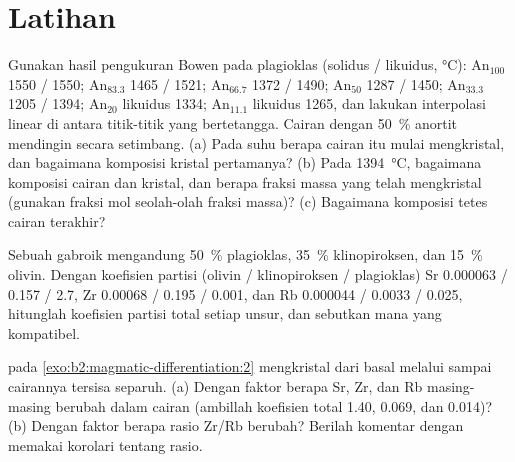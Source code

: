 \section{Latihan}

\begin{exercise}[$\star$]\label{exo:b2:magmatic-differentiation:1}
Gunakan hasil pengukuran Bowen pada plagioklas (solidus / likuidus, \unit{\celsius}):
An$_{100}$ 1550 / 1550; An$_{83.3}$ 1465 / 1521; An$_{66.7}$ 1372 / 1490; An$_{50}$
1287 / 1450; An$_{33.3}$ 1205 / 1394; An$_{20}$ likuidus 1334; An$_{11.1}$ likuidus
1265, dan lakukan interpolasi linear di antara titik-titik yang bertetangga. Cairan dengan
\qty{50}{\percent} anortit mendingin secara setimbang. (a) Pada suhu berapa cairan itu
mulai mengkristal, dan bagaimana komposisi kristal pertamanya? (b) Pada
\qty{1394}{\celsius}, bagaimana komposisi cairan dan kristal,
dan berapa fraksi massa yang telah mengkristal (gunakan fraksi mol seolah-olah fraksi
massa)? (c) Bagaimana komposisi tetes cairan terakhir?
\end{exercise}

\begin{exercise}[$\star$]\label{exo:b2:magmatic-differentiation:2}
Sebuah  gabroik mengandung \qty{50}{\percent} plagioklas, \qty{35}{\percent}
klinopiroksen, dan \qty{15}{\percent} olivin. Dengan koefisien partisi
(olivin / klinopiroksen / plagioklas) Sr 0.000063 / 0.157 / 2.7, Zr 0.00068 /
0.195 / 0.001, dan Rb 0.000044 / 0.0033 / 0.025, hitunglah koefisien partisi
total setiap unsur, dan sebutkan mana yang kompatibel.
\end{exercise}

\begin{exercise}[$\star$]\label{exo:b2:magmatic-differentiation:3}
 pada \cref{exo:b2:magmatic-differentiation:2} mengkristal dari basal melalui 
sampai cairannya tersisa separuh. (a) Dengan faktor berapa Sr, Zr, dan Rb masing-masing berubah
dalam cairan (ambillah koefisien total 1.40, 0.069, dan 0.014)? (b) Dengan faktor berapa
rasio Zr/Rb berubah? Berilah komentar dengan memakai korolari tentang rasio.
\end{exercise}

